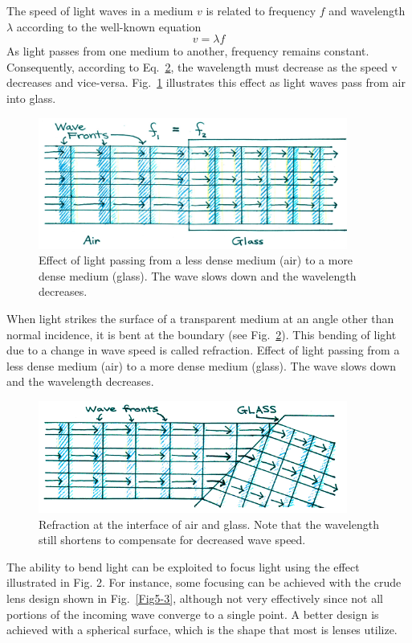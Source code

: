 The speed of light waves in a medium $v$ is related to frequency $f$ and wavelength $\lambda$ according to the well-known equation 
\begin{equation}\label{eqn5-2}
v = \lambda f
\end{equation}
As light passes from one medium to another, frequency remains constant.  Consequently, according to Eq.~\ref{Fig5-2}, the wavelength must decrease as the speed v decreases and vice-versa.  Fig.~\ref{Fig5-1} illustrates this effect as light waves pass from air into glass.  
\begin{figure}[h]
	\centering
	\includegraphics[width=4.0in]{./figures/Topic5/Fig5-1.jpg}
	\caption{Effect of light passing from a less dense medium (air) to a more dense medium (glass).  The wave slows down and the wavelength decreases.}
	\label{Fig5-1}
\end{figure}
When light strikes the surface of a transparent medium at an angle other than normal incidence, it is bent at the boundary (see Fig.~\ref{Fig5-2}). This bending of light due to a change in wave speed is called refraction. Effect of light passing from a less dense medium (air) to a more dense medium (glass).  The wave slows down and the wavelength decreases.
\begin{figure}[h]
	\centering
	\includegraphics[width=4.0in]{./figures/Topic5/Fig5-2.png}
	\caption{Refraction at the interface of air and glass.   Note that the wavelength still shortens to compensate for decreased wave speed.}
	\label{Fig5-2}
\end{figure}
The ability to bend light can be exploited to focus light using the effect illustrated in Fig. 2. For instance, some focusing can be achieved with the crude lens design shown in Fig.~\ref{Fig5-3}, although not very effectively since not all portions of the incoming wave converge to a single point. A better design is achieved with a spherical surface, which is the shape that most is lenses utilize. 
